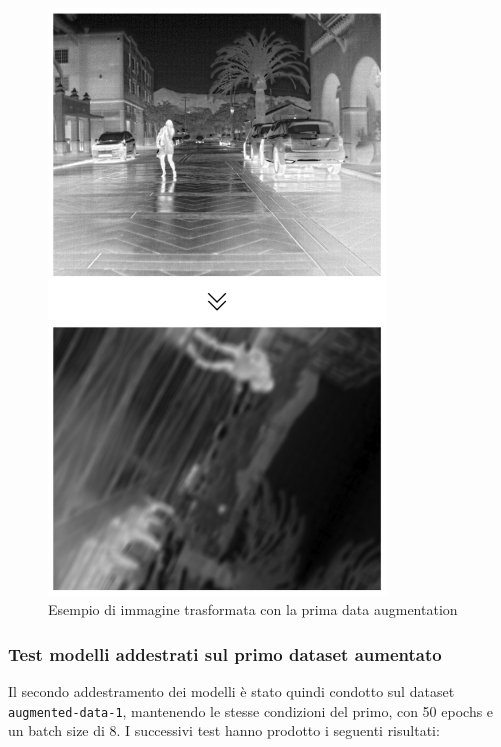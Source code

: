 \begin{figure}[ht]
    \centering
    \includegraphics[width=0.8\textwidth]{files/capitoli/4-sperimentazione-risultati/assets/augmented-data-1-example.png}
    \caption{\label{fig:augmented-data-1-example}Esempio di immagine trasformata con la prima data augmentation}
\end{figure}

\clearpage

\subsubsection{Test modelli addestrati sul primo dataset aumentato}
Il secondo addestramento dei modelli è stato quindi condotto sul dataset \texttt{augmented-data-1}, mantenendo le stesse condizioni del primo, con 50 epochs e un batch size di 8.
I successivi test hanno prodotto i seguenti risultati:

